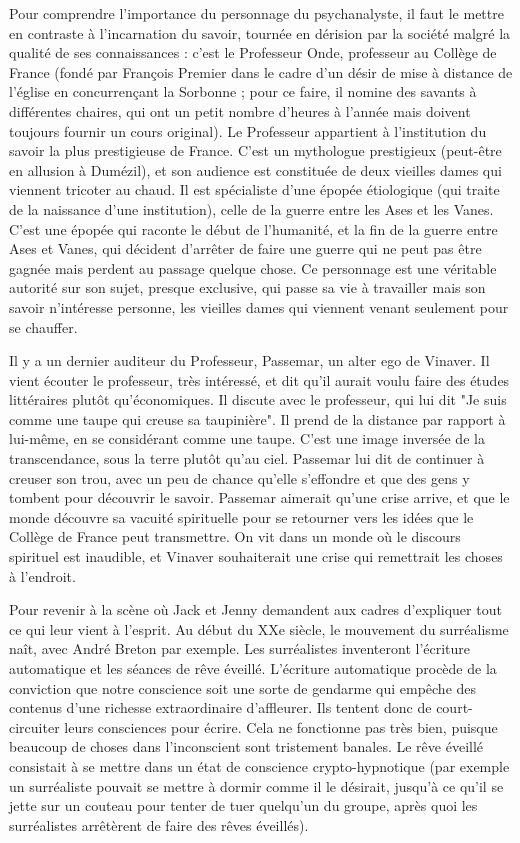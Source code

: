 \documentclass[a4paper,12pt]{book}
\begin{document}
\par Pour comprendre l'importance du personnage du psychanalyste, il faut le mettre en contraste à l'incarnation du savoir, tournée en dérision par la société malgré la qualité de ses connaissances : c'est le Professeur Onde, professeur au Collège de France (fondé par François Premier dans le cadre d'un désir de mise à distance de l'église en concurrençant la Sorbonne ; pour ce faire, il nomine des savants à différentes chaires, qui ont un petit nombre d'heures à l'année mais doivent toujours fournir un cours original). Le Professeur appartient à l'institution du savoir la plus prestigieuse de France. C'est un mythologue prestigieux (peut-être en allusion à Dumézil), et son audience est constituée de deux vieilles dames qui viennent tricoter au chaud. Il est spécialiste d'une épopée étiologique (qui traite de la naissance d'une institution), celle de la guerre entre les Ases et les Vanes. C'est une épopée qui raconte le début de l'humanité, et la fin de la guerre entre Ases et Vanes, qui décident d'arrêter de faire une guerre qui ne peut pas être gagnée mais perdent au passage quelque chose. Ce personnage est une véritable autorité sur son sujet, presque exclusive, qui passe sa vie à travailler mais son savoir n'intéresse personne, les vieilles dames qui viennent venant seulement pour se chauffer.
\par Il y a un dernier auditeur du Professeur, Passemar, un alter ego de Vinaver. Il vient écouter le professeur, très intéressé, et dit qu'il aurait voulu faire des études littéraires plutôt qu'économiques. Il discute avec le professeur, qui lui dit "Je suis comme une taupe qui creuse sa taupinière". Il prend de la distance par rapport à lui-même, en se considérant comme une taupe. C'est une image inversée de la transcendance, sous la terre plutôt qu'au ciel. Passemar lui dit de continuer à creuser son trou, avec un peu de chance qu'elle s'effondre et que des gens y tombent pour découvrir le savoir. Passemar aimerait qu'une crise arrive, et que le monde découvre sa vacuité spirituelle pour se retourner vers les idées que le Collège de France peut transmettre. On vit dans un monde où le discours spirituel est inaudible, et Vinaver souhaiterait une crise qui remettrait les choses à l'endroit.
\par Pour revenir à la scène où Jack et Jenny demandent aux cadres d'expliquer tout ce qui leur vient à l'esprit. Au début du XXe siècle, le mouvement du surréalisme naît, avec André Breton par exemple. Les surréalistes inventeront l'écriture automatique et les séances de rêve éveillé. L'écriture automatique procède de la conviction que notre conscience soit une sorte de gendarme qui empêche des contenus d'une richesse extraordinaire d'affleurer. Ils tentent donc de court-circuiter leurs consciences pour écrire. Cela ne fonctionne pas très bien, puisque beaucoup de choses dans l'inconscient sont tristement banales. Le rêve éveillé consistait à se mettre dans un état de conscience crypto-hypnotique (par exemple un surréaliste pouvait se mettre à dormir comme il le désirait, jusqu'à ce qu'il se jette sur un couteau pour tenter de tuer quelqu'un du groupe, après quoi les surréalistes arrêtèrent de faire des rêves éveillés).
\end{document}
